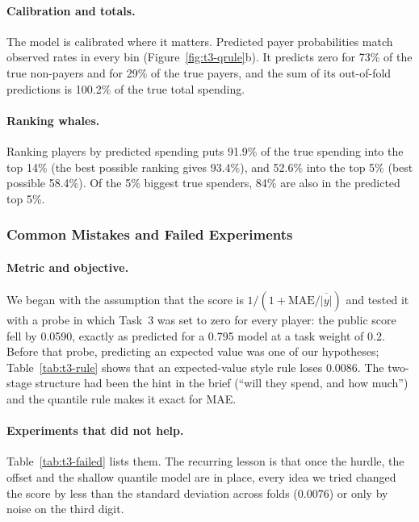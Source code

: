 \documentclass[../main.tex]{subfiles}
\begin{document}
\paragraph{Calibration and totals.} The model is calibrated where it matters. Predicted payer probabilities match observed rates in every bin (Figure~\ref{fig:t3-qrule}b). It predicts zero for 73\% of the true non-payers and for 29\% of the true payers, and the sum of its out-of-fold predictions is 100.2\% of the true total spending.

\paragraph{Ranking whales.} Ranking players by predicted spending puts 91.9\% of the true spending into the top 14\% (the best possible ranking gives 93.4\%), and 52.6\% into the top 5\% (best possible 58.4\%). Of the 5\% biggest true spenders, 84\% are also in the predicted top 5\%.

\subsubsection{Common Mistakes and Failed Experiments}
\label{sec:t3-mistakes}

\paragraph{Metric and objective.} We began with the assumption that the score is $1/(1+\mathrm{MAE}/\overline{|y|})$ and tested it with a probe in which Task~3 was set to zero for every player: the public score fell by 0.0590, exactly as predicted for a 0.795 model at a task weight of 0.2. Before that probe, predicting an expected value was one of our hypotheses; Table~\ref{tab:t3-rule} shows that an expected-value style rule loses 0.0086. The two-stage structure had been the hint in the brief (``will they spend, and how much'') and the quantile rule makes it exact for MAE.

\paragraph{Experiments that did not help.} Table~\ref{tab:t3-failed} lists them. The recurring lesson is that once the hurdle, the offset and the shallow quantile model are in place, every idea we tried changed the score by less than the standard deviation across folds (0.0076) or only by noise on the third digit.
\end{document}
